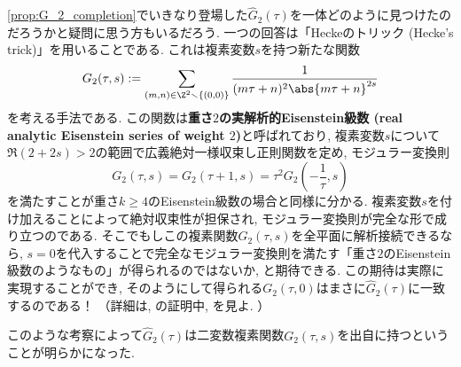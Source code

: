 \documentclass[11pt,b5paper,oneside,lualatex]{ltjsarticle} %
\numberwithin{equation}{section} %
\begin{document}
\begin{rem} \label{rem:Hecke_trick}
	\cref{prop:G_2_completion}でいきなり登場した$ \widehat{G}_2 (\tau) $を一体どのように見つけたのだろうかと疑問に思う方もいるだろう. 
	一つの回答は「Heckeのトリック (Hecke's trick)」を用いることである. 
	これは複素変数$ s $を持つ新たな関数
	\[
	G_2 (\tau, s) := \sum_{(m, n) \in \Z^2 \smallsetminus \{ (0, 0) \}} \frac{1}{(m\tau + n)^2 \abs{m\tau + n}^{2s}}
	\]
	を考える手法である. 
	この関数は\textbf{重さ$ 2 $の実解析的Eisenstein級数 (real analytic Eisenstein series of weight $ 2 $)}と呼ばれており, 
	複素変数$ s $について$ \Re(2+2s) > 2 $の範囲で広義絶対一様収束し正則関数を定め, モジュラー変換則
	\[
	G_2 (\tau, s) = G_2 (\tau+1, s) = \tau^{2} G_2 \left( - \frac{1}{\tau}, s \right)
	\]
	を満たすことが重さ$ k \ge 4 $のEisenstein級数の場合と同様に分かる. 
	複素変数$ s $を付け加えることによって絶対収束性が担保され, モジュラー変換則が完全な形で成り立つのである. 
	そこでもしこの複素関数$ G_2 (\tau, s) $を全平面に解析接続できるなら, $ s=0 $を代入することで完全なモジュラー変換則を満たす「重さ$ 2 $のEisenstein級数のようなもの」が得られるのではないか, と期待できる. 
	この期待は実際に実現することができ, そのようにして得られる$ G_2 (\tau, 0) $はまさに$ \widehat{G}_2 (\tau) $に一致するのである！
	（詳細は\cite[Theorem 4.10.2]{DS}, \cite[pp.~19, Proposition 6]{1-2-3}の証明中, \cite[Lemma 6.2]{BFOR}を見よ. ）
	
	このような考察によって$ \widehat{G}_2 (\tau) $は二変数複素関数$ G_2 (\tau, s) $を出自に持つということが明らかになった. 
\end{rem}
\end{document}
